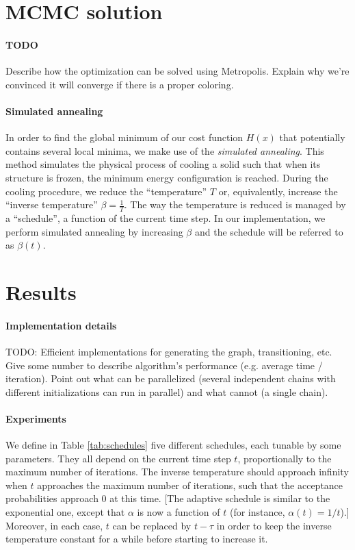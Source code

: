 \documentclass{article}
\begin{document}
  \section*{MCMC solution}
  \paragraph{TODO} Describe how the optimization can be solved using Metropolis. Explain why we're convinced it will converge if there is a proper coloring.

  \paragraph{Simulated annealing}
  In order to find the global minimum of our cost function $H(x)$ that potentially contains several local minima, we make use of the \textit{simulated annealing}. This method simulates the physical process of cooling a solid such that when its structure is frozen, the minimum energy configuration is reached. During the cooling procedure, we reduce the ``temperature'' $T$ or, equivalently, increase the ``inverse temperature'' $\beta=\frac{1}{T}$. The way the temperature is reduced is managed by a ``schedule'', a function of the current time step. In our implementation, we perform simulated annealing by increasing $\beta$ and the schedule will be referred to as $\beta(t)$.

  \section*{Results}
  \paragraph{Implementation details}
  TODO: Efficient implementations for generating the graph, transitioning, etc. Give some number to describe algorithm's performance (e.g. average time / iteration). Point out what can be parallelized (several independent chains with different initializations can run in parallel) and what cannot (a single chain).

  \paragraph{Experiments}  
  We define in Table \ref{tab:schedules} five different schedules, each tunable by some parameters. They all depend on the current time step $t$, proportionally to the maximum number of iterations. The inverse temperature should approach infinity when $t$ approaches the maximum number of iterations, such that the acceptance probabilities approach 0 at this time. [The adaptive schedule is similar to the exponential one, except that $\alpha$ is now a function of $t$ (for instance, $\alpha(t) = 1/t$).] Moreover, in each case, $t$ can be replaced by $t-\tau$ in order to keep the inverse temperature constant for a while before starting to increase it.
  
\end{document}
